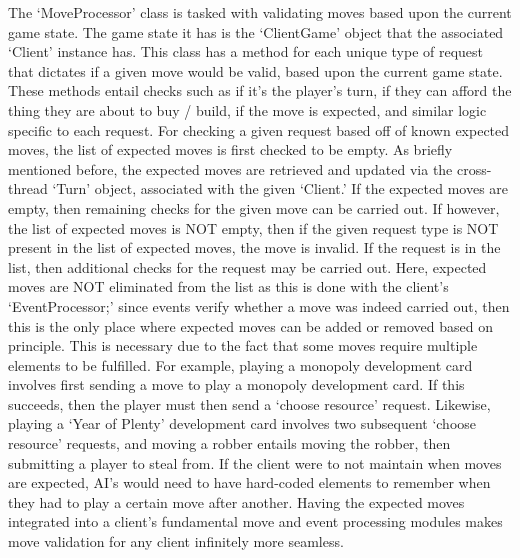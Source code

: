 \documentclass[a4paper,doc,draftfirst]{apa6}
\begin{document}
The ‘MoveProcessor’ class is tasked with validating moves based upon the current game state. The game state it has is the ‘ClientGame’ object that the associated ‘Client’ instance has. This class has a method for each unique type of request that dictates if a given move would be valid, based upon the current game state. These methods entail checks such as if it’s the player’s turn, if they can afford the thing they are about to buy / build, if the move is expected, and similar logic specific to each request. For checking a given request based off of known expected moves, the list of expected moves is first checked to be empty. As briefly mentioned before, the expected moves are retrieved and updated via the cross-thread ‘Turn’ object, associated with the given ‘Client.’ If the expected moves are empty, then remaining checks for the given move can be carried out. If however, the list of expected moves is NOT empty, then if the given request type is NOT present in the list of expected moves, the move is invalid. If the request is in the list, then additional checks for the request may be carried out. Here, expected moves are NOT eliminated from the list as this is done with the client’s ‘EventProcessor;’ since events verify whether a move was indeed carried out, then this is the only place where expected moves can be added or removed based on principle. This is necessary due to the fact that some moves require multiple elements to be fulfilled. For example, playing a monopoly development card involves first sending a move to play a monopoly development card. If this succeeds, then the player must then send a ‘choose resource’ request. Likewise, playing a ‘Year of Plenty’ development card involves two subsequent ‘choose resource’ requests, and moving a robber entails moving the robber, then submitting a player to steal from. If the client were to not maintain when moves are expected, AI’s would need to have hard-coded elements to remember when they had to play a certain move after another. Having the expected moves integrated into a client’s fundamental move and event processing modules makes move validation for any client infinitely more seamless.
\end{document}
